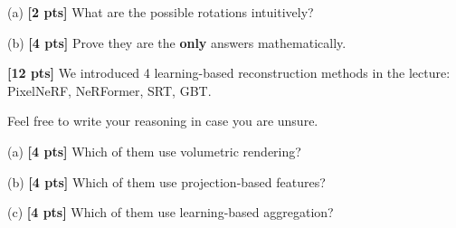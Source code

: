\begin{questions}
    (a) \textbf{[2 pts]}  What are the possible rotations intuitively?

    \begin{tcolorbox}[fit,height=5cm, width=\textwidth, blank, borderline={0.5pt}{-2pt},halign=left, valign=center, nobeforeafter]


    \end{tcolorbox}

    (b) \textbf{[4 pts]} Prove they are the \textbf{only} answers mathematically.

    \begin{tcolorbox}[fit,height=5cm, width=\textwidth, blank, borderline={0.5pt}{-2pt},halign=left, valign=center, nobeforeafter]


    \end{tcolorbox}

    \question \textbf{[12 pts]} We introduced 4 learning-based reconstruction methods in the lecture: PixelNeRF, NeRFormer, SRT, GBT.

    Feel free to write your reasoning in case you are unsure.

    (a) \textbf{[4 pts]} Which of them use volumetric rendering?

    \begin{tcolorbox}[fit,height=5cm, width=\textwidth, blank, borderline={0.5pt}{-2pt},halign=left, valign=center, nobeforeafter]


    \end{tcolorbox}

    (b) \textbf{[4 pts]} Which of them use projection-based features?

    \begin{tcolorbox}[fit,height=5cm, width=\textwidth, blank, borderline={0.5pt}{-2pt},halign=left, valign=center, nobeforeafter]


    \end{tcolorbox}


    \clearpage

    (c) \textbf{[4 pts]} Which of them use learning-based aggregation?


    \begin{tcolorbox}[fit,height=5cm, width=\textwidth, blank, borderline={0.5pt}{-2pt},halign=left, valign=center, nobeforeafter]


    \end{tcolorbox}

\end{questions}